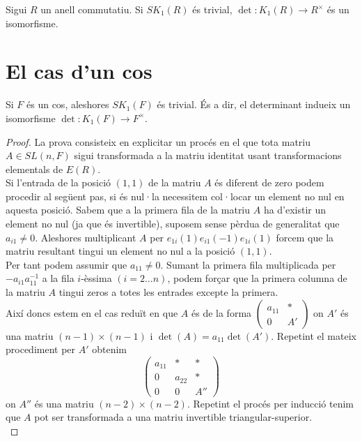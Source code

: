 \begin{cor}
Sigui $R$ un anell commutatiu. Si $SK_1(R)$ és trivial, $\det : K_1(R) \rightarrow R^\times$ és un isomorfisme.
\end{cor}

\section{El cas d'un cos}
\begin{prop} \label{K1Cos}
Si $F$ és un cos, aleshores $SK_1(F)$ és trivial. És a dir, el determinant indueix un isomorfisme $\det : K_1(F)\rightarrow F^\times$.
\end{prop}

\begin{proof}
La prova consisteix en explicitar un procés en el que tota matriu $A\in SL(n,F)$ sigui transformada a la matriu identitat usant transformacions elementals de $E(R)$. \\
\indent Si l'entrada de la posició $(1,1)$ de la matriu $A$ és diferent de zero podem procedir al següent pas, si és nul·la necessitem col·locar un element no nul en aquesta posició. Sabem que a la primera fila de la matriu $A$ ha d'existir un element no nul (ja que és invertible), suposem sense pèrdua de generalitat que $a_{i1}\neq 0$. Aleshores multiplicant $A$ per $e_{1i}(1)e_{i1}(-1)e_{1i}(1)$ forcem que la matriu resultant tingui un element no nul a la posició $(1,1)$.
\\
\indent Per tant podem assumir que $a_{11} \neq 0$. Sumant la primera fila multiplicada per  $-a_{i1}a_{11}^{-1}$ a la fila $i$-èssima $(i=2 \dots n)$, podem forçar que la primera columna de la matriu $A$ tingui zeros a totes les entrades excepte la primera. \\
Així doncs estem en el cas reduït en que $A$ és de la forma 
$
 \left( \begin{matrix}
  a_{11} & * \\
  0 & A'
 \end{matrix} \right)
 $
on $A'$ és una matriu $(n-1)\times (n-1)$ i $\det(A)=a_{11}\det(A')$. Repetint el mateix procediment per $A'$ obtenim 
$$
 \left( \begin{matrix}
  a_{11} & * & * \\
  0 & a_{22} & * \\
  0 & 0 & A''
 \end{matrix} \right)
 $$
 on $A''$ és una matriu $(n-2)\times (n-2)$. Repetint el procés per inducció tenim que $A$ pot ser transformada a una matriu invertible triangular-superior. \\

\end{proof}
